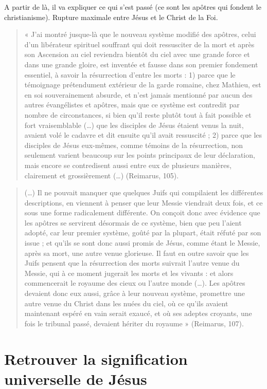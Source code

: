 A partir de là, il va expliquer ce qui s'est passé (ce sont les apôtres qui fondent le christianisme). Rupture maximale entre Jésus et le Christ de la Foi.

\begin{quote}
    « J’ai montré jusque-là que le nouveau système modifié des apôtres, celui d’un libérateur spirituel souffrant qui doit ressusciter de la mort et après son Ascension au ciel reviendra bientôt du ciel avec une grande force et dans une grande gloire, est inventée et fausse dans son premier fondement essentiel, à savoir la résurrection d’entre les morts : 1) parce que le témoignage prétendument extérieur de la garde romaine, chez Mathieu, est en soi souverainement absurde, et n’est jamais mentionné par aucun des autres évangélistes et apôtres, mais que ce système est contredit par nombre de circonstances, si bien qu’il reste plutôt tout à fait possible et fort vraisemblable (…) que les disciples de Jésus étaient venus la nuit, avaient volé le cadavre et dit ensuite qu’il avait ressuscité ; 2) parce que les disciples de Jésus eux-mêmes, comme témoins de la résurrection, non seulement varient beaucoup sur les points principaux de leur déclaration, mais encore se contredisent aussi entre eux de plusieurs manières, clairement et grossièrement (…) (Reimarus, 105).
\end{quote}


\begin{quote}
    (…) Il ne pouvait manquer que quelques Juifs qui compilaient les différentes descriptions, en viennent à penser que leur Messie viendrait deux fois, et ce sous une forme radicalement différente. On conçoit donc avec évidence que les apôtres se servirent désormais de ce système, bien que peu l’aient adopté, car leur premier système, goûté par la plupart, était réfuté par son issue ; et qu’ils se sont donc aussi promis de Jésus, comme étant le Messie, après sa mort, une autre venue glorieuse. Il faut en outre savoir que les Juifs pensent que la résurrection des morts suivrait l’autre venue du Messie, qui à ce moment jugerait les morts et les vivants : et alors commencerait le royaume des cieux ou l’autre monde (…). Les apôtres devaient donc eux aussi, grâce à leur nouveau système, promettre une autre venue du Christ dans les nuées du ciel, où ce qu’ils avaient maintenant espéré en vain serait exaucé, et où ses adeptes croyants, une fois le tribunal passé, devaient hériter du royaume » (Reimarus, 107).
\end{quote}
\section{Retrouver la signification universelle de Jésus}

